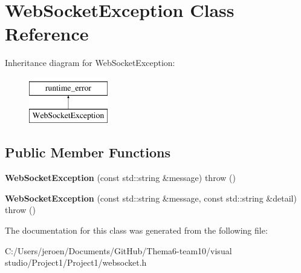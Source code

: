 \hypertarget{class_web_socket_exception}{}\section{Web\+Socket\+Exception Class Reference}
\label{class_web_socket_exception}
Inheritance diagram for Web\+Socket\+Exception\+:\begin{figure}[H]
\begin{center}
\leavevmode
\includegraphics[height=2.000000cm]{class_web_socket_exception}
\end{center}
\end{figure}
\subsection*{Public Member Functions}
\begin{DoxyCompactItemize}
\item 
{\bfseries Web\+Socket\+Exception} (const std\+::string \&message)  throw ()\hypertarget{class_web_socket_exception_a4e9b9ed1a9eb36fedaa78f96e6f0f576}{}\label{class_web_socket_exception_a4e9b9ed1a9eb36fedaa78f96e6f0f576}

\item 
{\bfseries Web\+Socket\+Exception} (const std\+::string \&message, const std\+::string \&detail)  throw ()\hypertarget{class_web_socket_exception_a2b4b4e3c1c31fcafd8277259d9475afc}{}\label{class_web_socket_exception_a2b4b4e3c1c31fcafd8277259d9475afc}

\end{DoxyCompactItemize}


The documentation for this class was generated from the following file\+:\begin{DoxyCompactItemize}
\item 
C\+:/\+Users/jeroen/\+Documents/\+Git\+Hub/\+Thema6-\/team10/visual studio/\+Project1/\+Project1/websocket.\+h\end{DoxyCompactItemize}
